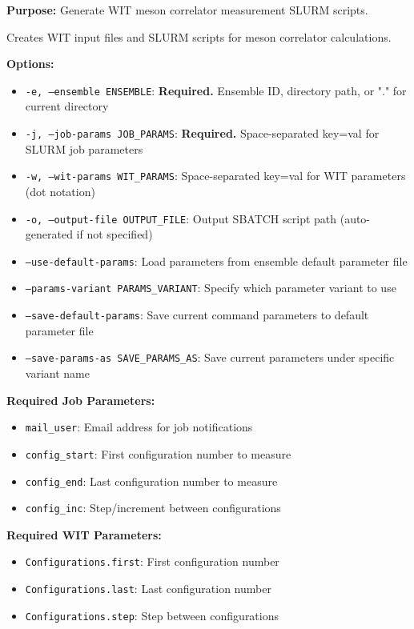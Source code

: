 \documentclass{article}
\begin{document}
\textbf{Purpose:} Generate WIT meson correlator measurement SLURM scripts.

Creates WIT input files and SLURM scripts for meson correlator calculations.

\textbf{Options:}
\begin{itemize}
\item \texttt{-e, --ensemble ENSEMBLE}: \textbf{Required.} Ensemble ID, directory path, or "." for current directory
\item \texttt{-j, --job-params JOB\_PARAMS}: \textbf{Required.} Space-separated key=val for SLURM job parameters
\item \texttt{-w, --wit-params WIT\_PARAMS}: Space-separated key=val for WIT parameters (dot notation)
\item \texttt{-o, --output-file OUTPUT\_FILE}: Output SBATCH script path (auto-generated if not specified)
\item \texttt{--use-default-params}: Load parameters from ensemble default parameter file
\item \texttt{--params-variant PARAMS\_VARIANT}: Specify which parameter variant to use
\item \texttt{--save-default-params}: Save current command parameters to default parameter file
\item \texttt{--save-params-as SAVE\_PARAMS\_AS}: Save current parameters under specific variant name
\end{itemize}

\textbf{Required Job Parameters:}
\begin{itemize}
\item \texttt{mail\_user}: Email address for job notifications
\item \texttt{config\_start}: First configuration number to measure
\item \texttt{config\_end}: Last configuration number to measure
\item \texttt{config\_inc}: Step/increment between configurations
\end{itemize}

\textbf{Required WIT Parameters:}
\begin{itemize}
\item \texttt{Configurations.first}: First configuration number
\item \texttt{Configurations.last}: Last configuration number
\item \texttt{Configurations.step}: Step between configurations
\end{itemize}
\end{document}
